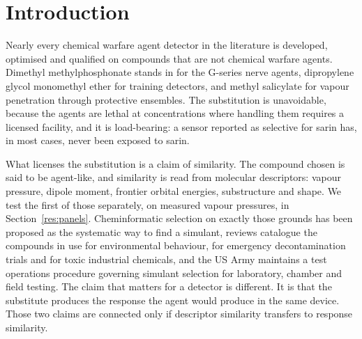 \documentclass[journal=jacsat,manuscript=article,margin=1in]{achemso}
\begin{document}
\section{Introduction}

Nearly every chemical warfare agent detector in the literature is developed,
optimised and qualified on compounds that are not chemical warfare
agents.\cite{askim2013,rakow2000} Dimethyl methylphosphonate stands in for
the G-series nerve agents,\cite{niosh2002simulant} dipropylene glycol
monomethyl ether for training detectors,\cite{seitzinger2006simulant} and
methyl salicylate for vapour penetration through protective
ensembles.\cite{nrc1997mist,astmf2588} The substitution is unavoidable,
because the agents are lethal at concentrations where handling them requires
a licensed facility, and it is load-bearing: a sensor reported as selective
for sarin has, in most cases, never been exposed to sarin.

What licenses the substitution is a claim of similarity. The compound chosen
is said to be agent-like, and similarity is read from molecular
descriptors: vapour pressure, dipole moment, frontier orbital energies,
substructure and shape. We test the first of those separately, on measured
vapour pressures, in Section~\ref{res:panels}. Cheminformatic selection on exactly those grounds
has been proposed as the systematic way to find a
simulant,\cite{lavoie2011} reviews catalogue the compounds in use for
environmental behaviour,\cite{bartelthunt2008} for emergency
decontamination trials\cite{james2018} and for toxic industrial
chemicals,\cite{james2021} and the US Army maintains a test operations
procedure governing simulant selection for laboratory, chamber and field
testing.\cite{top082196} The claim that matters for a detector is
different. It is that the substitute produces the response the agent would
produce in the same device. Those two claims are connected only if
descriptor similarity transfers to response similarity.
\end{document}
